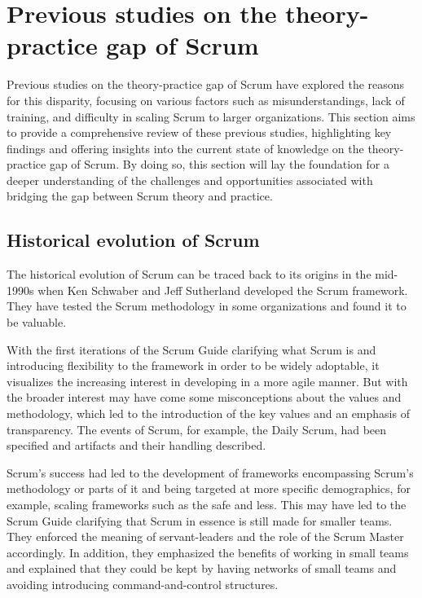 \section{Previous studies on the theory-practice gap of Scrum}\label{sec:PreviousStudies}
Previous studies on the theory-practice gap of Scrum have explored the reasons for this disparity, focusing on various factors such as misunderstandings, lack of training, and difficulty in scaling Scrum to larger organizations. This section aims to provide a comprehensive review of these previous studies, highlighting key findings and offering insights into the current state of knowledge on the theory-practice gap of Scrum. By doing so, this section will lay the foundation for a deeper understanding of the challenges and opportunities associated with bridging the gap between Scrum theory and practice.

\subsection*{Historical evolution of Scrum}\label{subsec:historyOfScrum}
The historical evolution of Scrum can be traced back to its origins in the mid-1990s when Ken Schwaber and Jeff Sutherland developed the Scrum \gls{framework}. They have tested the Scrum \gls{methodology} in some organizations and found it to be valuable.

With the first iterations of the Scrum Guide clarifying what Scrum is and introducing flexibility to the \gls{framework} in order to be widely adoptable, it visualizes the increasing interest in developing in a more \gls{agile} manner. But with the broader interest may have come some misconceptions about the values and \gls{methodology}, which led to the introduction of the key values and an emphasis of transparency. The events of Scrum, for example, the Daily Scrum, had been specified and artifacts and their handling described.~\cite[Revision 2010--2013]{Schwaber2020SGR}

Scrum's success had led to the development of \glspl{framework} encompassing Scrum's \gls{methodology} or parts of it and being targeted at more specific demographics, for example, scaling \glspl{framework} such as the \ac{safe} and \ac{less}. This may have led to the Scrum Guide clarifying that Scrum in essence is still made for smaller teams. They enforced the meaning of servant-leaders and the role of the Scrum Master accordingly. In addition, they emphasized the benefits of working in small teams and explained that they could be kept by having networks of small teams and avoiding introducing command-and-control structures.~\cite[Revision 2013--2017]{Schwaber2020SGR}

